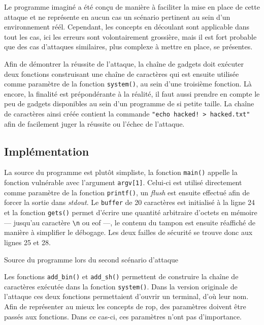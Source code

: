 Le programme imaginé a été conçu de manière à faciliter la mise en place de cette
attaque et ne représente en aucun cas un scénario pertinent au sein d'un environnement
réél. Cependant, les concepts en découlant sont applicable dans tout les cas, ici les
erreurs sont volontairement grossière, mais il est fort probable que des cas
d'attaques similaires, plus complexe à mettre en place, se présentes.

Afin de démontrer la réussite de l'attaque, la chaîne de gadgets doit exécuter deux
fonctions construisant une chaîne de caractères qui est ensuite utilisée comme
paramètre de la fonction \texttt{system()}, au sein d'une troisième fonction. Là
encore, la finalité est prépondérante à la réalité, il faut aussi prendre en compte le
peu de gadgets disponibles au sein d'un programme de si petite taille. La chaîne de
caractères ainsi créée contient la commande \texttt{"echo hacked! > hacked.txt"} afin
de facilement juger la réussite ou l'échec de l'attaque.


\subsection{Implémentation}

La source du programme est plutôt simpliste, la fonction \texttt{main()} appelle la
fonction vulnérable avec l'argument \texttt{argv[1]}. Celui-ci est utilisé directement
comme paramètre de la fonction \texttt{printf()}, un \textit{flush} est ensuite
effectué afin de forcer la sortie dans \textit{stdout}. Le \texttt{buffer} de 20
caractères est initialisé à la ligne 24 et la fonction \texttt{gets()} permet d'écrire
une quantité arbitraire d'octets en mémoire --- jusqu'au caractère
\texttt{\textbackslash n} ou \gls{eof} ---, le contenu du tampon est ensuite réaffiché
de manière à simplifier le débogage. Les deux failles de sécurité se trouve donc aux
lignes 25 et 28.

\begin{listing}
	\caption{Source du programme lors du second scénario d'attaque}
	\label{lst:rop2}
\end{listing}

Les fonctions \texttt{add\_bin()} et \texttt{add\_sh()} permettent de construire la
chaîne de caractères exécutée dans la fonction \texttt{system()}. Dans la version
originale de l'attaque ces deux fonctions permettaient d'ouvrir un terminal, d'où leur
nom. Afin de représenter au mieux les concepts de \gls{rop}, des paramètres doivent
être passés aux fonctions. Dans ce cas-ci, ces paramètres n'ont pas d'importance.

